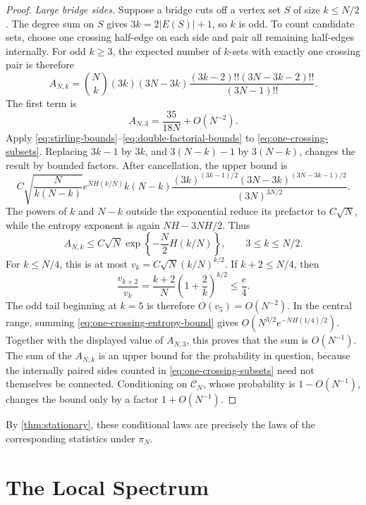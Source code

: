 \documentclass[11pt]{article}
\theoremstyle{plain}
\theoremstyle{definition}
\numberwithin{equation}{section}
\begin{document}
\begin{proof}
\smallskip
\noindent\emph{Large bridge sides.}
Suppose a bridge cuts off a vertex set $S$ of size $k\leq N/2$.
The degree sum on $S$ gives $3k=2|E(S)|+1$, so $k$ is odd.  To count candidate
sets, choose one crossing half-edge on each side and pair all remaining
half-edges internally.  For odd $k\geq3$, the expected number of $k$-sets
with exactly one crossing pair is therefore
\begin{equation}\label{eq:one-crossing-subsets}
  A_{N,k}=\binom Nk(3k)(3N-3k)
  \frac{(3k-2)!!(3N-3k-2)!!}{(3N-1)!!}.
\end{equation}
The first term is
\[
  A_{N,3}=\frac{35}{18N}+O(N^{-2}).
\]
Apply \eqref{eq:stirling-bounds}--\eqref{eq:double-factorial-bounds} to
\eqref{eq:one-crossing-subsets}.  Replacing $3k-1$ by $3k$, and
$3(N-k)-1$ by $3(N-k)$, changes the result by bounded factors.  After
cancellation, the upper bound is
\[
 C\sqrt{\frac{N}{k(N-k)}}e^{NH(k/N)}k(N-k)
 \frac{(3k)^{(3k-1)/2}(3N-3k)^{(3N-3k-1)/2}}
      {(3N)^{3N/2}}.
\]
The powers of $k$ and $N-k$ outside the exponential reduce its prefactor to
$C\sqrt N$, while the entropy exponent is again $N H-3NH/2$.  Thus
\begin{equation}\label{eq:one-crossing-entropy-bound}
 A_{N,k}\leq C\sqrt N
 \exp\left\{-\frac N2H(k/N)\right\},
 \qquad 3\leq k\leq N/2.
\end{equation}
For $k\leq N/4$, this is at most
$v_k=C\sqrt N(k/N)^{k/2}$.  If $k+2\leq N/4$, then
\[
 \frac{v_{k+2}}{v_k}
 =\frac{k+2}{N}\left(1+\frac2k\right)^{k/2}
 \leq\frac e4.
\]
The odd tail beginning at
$k=5$ is therefore $O(v_5)=O(N^{-2})$.  In the central range, summing
\eqref{eq:one-crossing-entropy-bound} gives
$O(N^{3/2}e^{-NH(1/4)/2})$.  Together with the displayed value of $A_{N,3}$,
this proves that the sum is $O(N^{-1})$.
The sum of the $A_{N,k}$ is an upper bound for the probability in question,
because the internally paired sides counted in
\eqref{eq:one-crossing-subsets} need not themselves be connected.
Conditioning on $\mathcal C_N$, whose probability is $1-O(N^{-1})$, changes
the bound only by a factor $1+O(N^{-1})$.
\end{proof}

By \cref{thm:stationary}, these conditional laws are precisely the laws of the
corresponding statistics under $\pi_N$.

\section{The Local Spectrum}\label{sec:spectrum}
\end{document}

